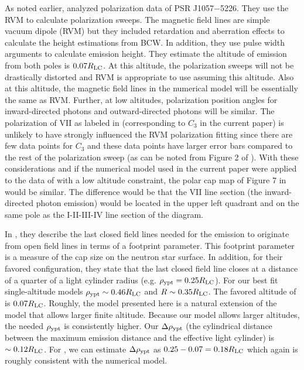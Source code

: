 As noted earlier, \cite{weltevrede2009mapping} analyzed polarization data of
PSR J1057$-$5226.  They use the RVM to calculate polarization sweeps.
The magnetic field lines are simple vacuum dipole (RVM) but they included
retardation and aberration effects to calculate the height estimations
from BCW. In addition, they use pulse width arguments to calculate emission 
height.  They estimate the
altitude of emission from both poles  is $0.07R_{\rm{LC}}$.  At this altitude, the
polarization sweeps will not be drastically distorted \citep{craig2012altitude} 
and RVM is appropriate to use assuming this altitude.  Also at this altitude, the
magnetic field lines in the numerical model will be essentially the same
as RVM.  Further, at low altitudes, polarization position angles for
inward-directed photons and outward-directed photons will be similar.
The polarization of VII as labeled in \cite{weltevrede2009mapping}
(corresponding to $C_3$ in the current paper) is unlikely to have strongly
influenced the RVM polarization fitting since there are few data points
for $C_3$ and these data points have larger error bars compared to the rest
of the polarization sweep (as can be noted from Figure 2 of \citealp{weltevrede2009mapping}).  
With these considerations and if the numerical model used
in the current paper were applied to the data of \cite{weltevrede2009mapping}
with a low altitude constraint, the polar cap map of Figure 7 in
\cite{weltevrede2009mapping} would be similar.  The difference would be that
the VII line section (the inward-directed photon emission) would be
located in the upper left quadrant and on the same pole as the
I-II-III-IV line section of the diagram.

In \cite{weltevrede2009mapping}, they describe the last closed field lines
needed for the emission to originate from open field lines in terms of a
footprint parameter.  This footprint parameter is a measure of the cap
size on the neutron star surface.   In addition, for their favored
configuration, they state that the last closed field line closes at a distance
of a quarter of a light cylinder radius (e.g. $\rho_{\rm{ypt}}=0.25R_{\rm{LC}}$).  For our best
fit single-altitude models $\rho_{\rm{ypt}}\sim0.46R_{\rm{LC}}$ and $R\sim0.35R_{\rm{LC}}$.  The favored
altitude of  \cite{weltevrede2009mapping} is $0.07R_{\rm{LC}}$.  Roughly, the model
presented here is a natural extension of the \cite{weltevrede2009mapping}
model that allows larger finite altitude.  Because our model allows
larger altitudes, the needed $\rho_{\rm{ypt}}$ is consistently higher.  Our $\Delta \rho_{\rm{ypt}}$
(the cylindrical distance between the maximum emission distance and the
effective light cylinder) is $\sim0.12R_{\rm{LC}}$.  For \cite{weltevrede2009mapping}, we
can estimate $\Delta \rho_{\rm{ypt}}$ as $0.25-0.07=0.18R_{\rm{LC}}$ which again is roughly
consistent with the numerical model.

